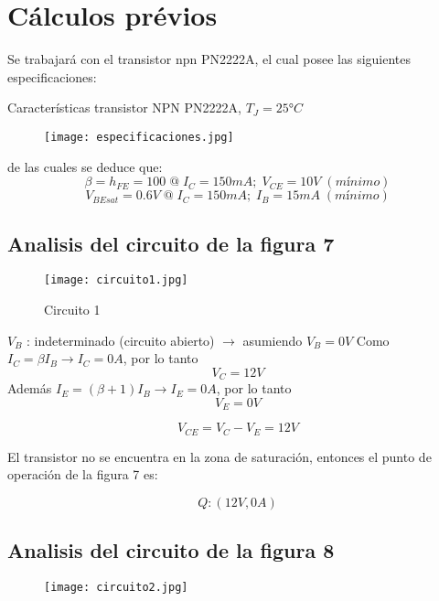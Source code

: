 \documentclass[10pt, a4paper]{article}
\begin{document}
    \newpage

    \section{Cálculos prévios}

    Se trabajará con el transistor npn PN2222A, el cual posee las siguientes especificaciones:

    \begin{table}
        \centering
        \caption{Características transistor NPN PN2222A, $T_J = 25°C$}
        \begin{figure}
            \centering
            \texttt{[image: especificaciones.jpg]}
        \end{figure}
    \end{table}

    de las cuales se deduce que:
    $$\beta = h_{FE} = 100 \; @ \; I_C = 150mA; \; V_{CE} = 10V \; (mínimo)$$
    $$V_{BEsat} = 0.6V \; @ \; I_C = 150mA; \; I_B = 15mA \; (mínimo)$$

    \subsection{Analisis del circuito de la figura 7}

    \begin{figure}[h!]
        \centering
        \texttt{[image: circuito1.jpg]} \par
        Circuito 1
    \end{figure}

    $V_B$ : indeterminado (circuito abierto) $\rightarrow$ asumiendo $V_B = 0V$
    Como $I_C = \beta I_B \longrightarrow I_C = 0A$, por lo tanto
    $$V_C = 12V$$
    Además $I_E = (\beta + 1)I_B \longrightarrow I_E = 0A$, por lo tanto
    $$V_E = 0V$$

    $$V_{CE} = V_C - V_E = 12V$$

    El transistor no se encuentra en la zona de saturación, entonces el punto de operación de la figura 7 es:

    $$Q : (12V, 0A)$$

    \subsection{Analisis del circuito de la figura 8}

    \begin{figure}[h!]
        \centering
        \texttt{[image: circuito2.jpg]}
    \end{figure}
\end{document}
